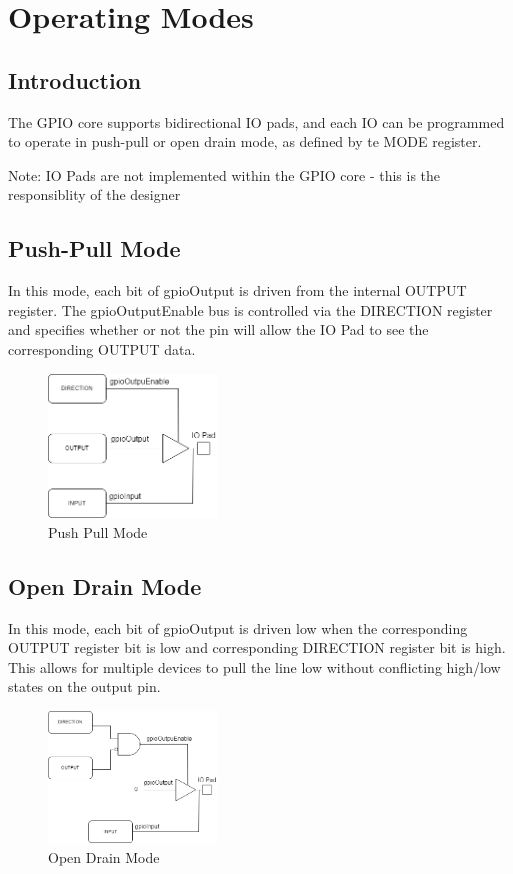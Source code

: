 \section{Operating Modes}

\subsection{Introduction}
The GPIO core supports bidirectional IO pads, and each IO can be programmed to operate in 
push-pull or open drain mode, as defined by te MODE register.

Note: IO Pads are not implemented within the GPIO core - this is the responsiblity of the designer

\subsection{Push-Pull Mode}
In this mode, each bit of gpioOutput is driven from the internal OUTPUT register. The gpioOutputEnable bus is controlled via the DIRECTION register and 
specifies whether or not the pin will allow the IO Pad to see the corresponding OUTPUT data.

\begin{figure}[h]
    \centering
    \includegraphics[width=0.4\textwidth]{images/ppl.png}
    \caption{Push Pull Mode}
  \end{figure}

\subsection{Open Drain Mode}
In this mode, each bit of gpioOutput is driven low when the corresponding OUTPUT register bit is low and corresponding DIRECTION register bit is high. 
This allows for multiple devices to pull the line low without conflicting high/low states on the output pin.

\begin{figure}[h]
    \centering
    \includegraphics[width=0.4\textwidth]{images/od.drawio.png}
    \caption{Open Drain Mode}
  \end{figure}